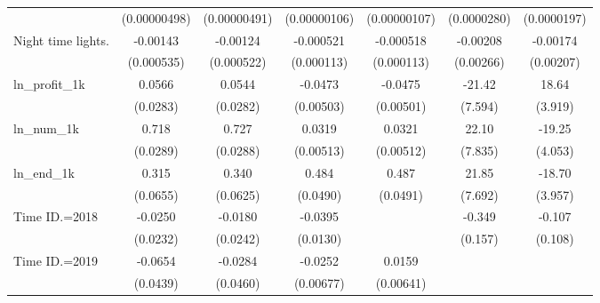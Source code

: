 {\begin{tabular}{l*{6}{c}}
                    &(0.00000498)         &(0.00000491)         &(0.00000106)         &(0.00000107)         & (0.0000280)         & (0.0000197)         \\
\addlinespace
Night time lights.  &    -0.00143\sym{***}&    -0.00124\sym{**} &   -0.000521\sym{***}&   -0.000518\sym{***}&    -0.00208         &    -0.00174         \\
                    &  (0.000535)         &  (0.000522)         &  (0.000113)         &  (0.000113)         &   (0.00266)         &   (0.00207)         \\
\addlinespace
ln\_profit\_1k        &      0.0566\sym{**} &      0.0544\sym{*}  &     -0.0473\sym{***}&     -0.0475\sym{***}&      -21.42\sym{***}&       18.64\sym{***}\\
                    &    (0.0283)         &    (0.0282)         &   (0.00503)         &   (0.00501)         &     (7.594)         &     (3.919)         \\
\addlinespace
ln\_num\_1k           &       0.718\sym{***}&       0.727\sym{***}&      0.0319\sym{***}&      0.0321\sym{***}&       22.10\sym{***}&      -19.25\sym{***}\\
                    &    (0.0289)         &    (0.0288)         &   (0.00513)         &   (0.00512)         &     (7.835)         &     (4.053)         \\
\addlinespace
ln\_end\_1k           &       0.315\sym{***}&       0.340\sym{***}&       0.484\sym{***}&       0.487\sym{***}&       21.85\sym{***}&      -18.70\sym{***}\\
                    &    (0.0655)         &    (0.0625)         &    (0.0490)         &    (0.0491)         &     (7.692)         &     (3.957)         \\
\addlinespace
Time ID.=2018       &     -0.0250         &     -0.0180         &     -0.0395\sym{***}&                     &      -0.349\sym{**} &      -0.107         \\
                    &    (0.0232)         &    (0.0242)         &    (0.0130)         &                     &     (0.157)         &     (0.108)         \\
\addlinespace
Time ID.=2019       &     -0.0654         &     -0.0284         &     -0.0252\sym{***}&      0.0159\sym{**} &                     &                     \\
                    &    (0.0439)         &    (0.0460)         &   (0.00677)         &   (0.00641)         &                     &                     \\

\end{tabular}}
